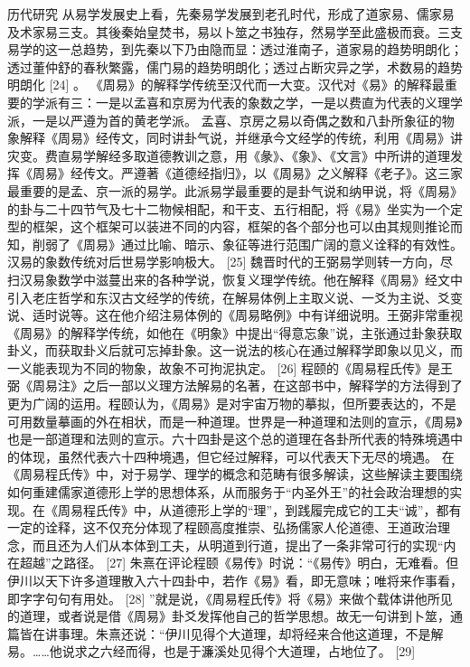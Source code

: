 \documentclass[a4paper,12pt,UTF8,twoside]{ctexbook}
\begin{document}
历代研究
从易学发展史上看，先秦易学发展到老孔时代，形成了道家易、儒家易及术家易三支。其後秦始皇焚书，易以卜筮之书独存，然易学至此盛极而衰。三支易学的这一总趋势，到先秦以下乃由隐而显：透过淮南子，道家易的趋势明朗化；透过董仲舒的春秋繁露，儒门易的趋势明朗化；透过占断灾异之学，术数易的趋势明朗化 [24]
。
《周易》的解释学传统至汉代而一大变。汉代对《易》的解释最重要的学派有三：一是以孟喜和京房为代表的象数之学，一是以费直为代表的义理学派，一是以严遵为首的黄老学派。
孟喜、京房之易以奇偶之数和八卦所象征的物象解释《周易》经传文，同时讲卦气说，并继承今文经学的传统，利用《周易》讲灾变。费直易学解经多取道德教训之意，用《彖》、《象》、《文言》中所讲的道理发挥《周易》经传文。严遵著《道德经指归》，以《周易》之义解释《老子》。这三家最重要的是孟、京一派的易学。此派易学最重要的是卦气说和纳甲说，将《周易》的卦与二十四节气及七十二物候相配，和干支、五行相配，将《易》坐实为一个定型的框架，这个框架可以装进不同的内容，框架的各个部分也可以由其规则推论而知，削弱了《周易》通过比喻、暗示、象征等进行范围广阔的意义诠释的有效性。汉易的象数传统对后世易学影响极大。 [25]
魏晋时代的王弼易学则转一方向，尽扫汉易象数学中滋蔓出来的各种学说，恢复义理学传统。他在解释《周易》经文中引入老庄哲学和东汉古文经学的传统，在解易体例上主取义说、一爻为主说、爻变说、适时说等。这在他介绍注易体例的《周易略例》中有详细说明。王弼非常重视《周易》的解释学传统，如他在《明象》中提出“得意忘象”说，主张通过卦象获取卦义，而获取卦义后就可忘掉卦象。这一说法的核心在通过解释学即象以见义，而一义能表现为不同的物象，故象不可拘泥执定。 [26]
程颐的《周易程氏传》是王弼《周易注》之后一部以义理方法解易的名著，在这部书中，解释学的方法得到了更为广阔的运用。程颐认为，《周易》是对宇宙万物的摹拟，但所要表达的，不是可用数量摹画的外在相状，而是一种道理。世界是一种道理和法则的宣示，《周易》也是一部道理和法则的宣示。六十四卦是这个总的道理在各卦所代表的特殊境遇中的体现，虽然代表六十四种境遇，但它经过解释，可以代表天下无尽的境遇。
在《周易程氏传》中，对于易学、理学的概念和范畴有很多解读，这些解读主要围绕如何重建儒家道德形上学的思想体系，从而服务于“内圣外王”的社会政治理想的实现。在《周易程氏传》中，从道德形上学的“理”，到践履完成它的工夫“诚”，都有一定的诠释，这不仅充分体现了程颐高度推崇、弘扬儒家人伦道德、王道政治理念，而且还为人们从本体到工夫，从明道到行道，提出了一条非常可行的实现“内在超越”之路径。 [27]
朱熹在评论程颐《易传》时说：“《易传》明白，无难看。但伊川以天下许多道理散入六十四卦中，若作《易》看，即无意味；唯将来作事看，即字字句句有用处。 [28] ”就是说，《周易程氏传》将《易》来做个载体讲他所见的道理，或者说是借《周易》卦爻发挥他自己的哲学思想。故无一句讲到卜筮，通篇皆在讲事理。朱熹还说：“伊川见得个大道理，却将经来合他这道理，不是解易。……他说求之六经而得，也是于濂溪处见得个大道理，占地位了。 [29]
\end{document}
